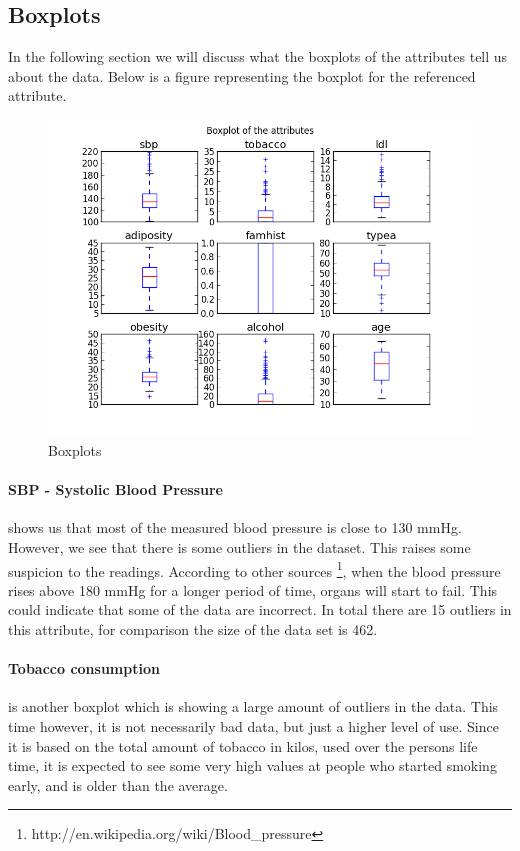 \subsection{Boxplots}
\label{boxplotSection}
In the following section we will discuss what the boxplots of the attributes tell us about the data.
Below is a figure representing the boxplot for the referenced attribute.
\begin{figure}[H]
\centering
\includegraphics[width=12cm, keepaspectratio=true]{pictures/boxplot.png}
\caption{\footnotesize Boxplots}
\label{boxplot}
\end{figure}
\paragraph{SBP - Systolic Blood Pressure} shows us that most of the measured blood pressure is close to 130 mmHg. However, we see that there is some outliers in the dataset. This raises some suspicion to the readings. According to other sources \footnote{http://en.wikipedia.org/wiki/Blood\_pressure}, when the blood pressure rises above 180 mmHg for a longer period of time, organs will start to fail. This could indicate that some of the data are incorrect.
In total there are 15 outliers in this attribute, for comparison the size of the data set is 462.

\paragraph{Tobacco consumption} is another boxplot which is showing a large amount of outliers in the data. This time however, it is not necessarily bad data, but just a higher level of use. Since it is based on the total amount of tobacco in kilos, used over the persons life time, it is expected to see some very high values at people who started smoking early, and is older than the average.

